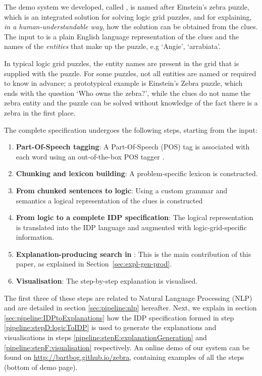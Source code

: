 The demo system we developed, called \ourtool, is named after Einstein's zebra puzzle, which is an integrated solution for solving logic grid puzzles, and for explaining, \textit{in a human-understandable way}, how the solution can be obtained from the clues. 
The input to \ourtool is a plain English language representation of the clues and the names of the \textit{entities} that make up the puzzle, e.g  `Angie', `arrabiata'. 

In typical logic grid puzzles, the entity names are present in the grid that is supplied with the puzzle. For some puzzles, not all entities are named or required to know in advance; a prototypical example is Einstein's Zebra puzzle, which ends with the question `Who owns the zebra?', while the clues do not name the zebra entity and the puzzle can be solved without knowledge of the fact there is a zebra in the first place.

The complete specification undergoes the following steps, starting from the input:

\begin{enumerate}[label=\textbf{\Alph*},ref=\emph{Step~\Alph*}]
	\item \label{pipeline:stepA:POS} \textbf{Part-Of-Speech tagging}: A Part-Of-Speech (POS) tag is associated with each word using an out-of-the-box POS tagger \cite{DBLP:journals/coling/MarcusSM94}.
	\item \label{pipeline:stepB:chukingLexicon} \textbf{Chunking and lexicon building}: A problem-specific lexicon is constructed.
	\item \label{pipeline:stepC:ChunkedToLogic} \textbf{From chunked sentences to logic}: Using a custom grammar and semantics a logical representation of the clues is constructed
	\item \label{pipeline:stepD:logicToIDP} \textbf{From logic to a complete IDP specification}: The logical representation is translated into the IDP language and augmented with logic-grid-specific information.
	\item \label{pipeline:stepE:explanationGeneration} \textbf{Explanation-producing search in \idp}: This is the main contribution of this paper, as explained in Section~\ref{sec:expl-gen-prod}.
	\item \label{pipeline:stepF:visualisation} \textbf{Visualisation}: The step-by-step explanation is visualised. 
\end{enumerate}

The first three of these steps are related to Natural Language Processing (NLP) and are detailed in section \ref{sec:pipeline:nlp} hereafter. 
Next, we explain in section \ref{sec:pipeline:IDPtoExplanations} how the IDP specification formed in step \ref{pipeline:stepD:logicToIDP} is used to generate the explanations and visualisations in steps \ref{pipeline:stepE:explanationGeneration} and \ref{pipeline:stepF:visualisation} respectively.
An online demo of our system can be found on \url{http://bartbog.github.io/zebra}, containing examples of all the steps (bottom of demo page). 

